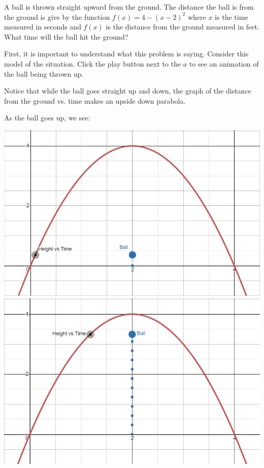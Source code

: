 \documentclass[nooutcomes]{ximera}
\begin{document}
\begin{example}
A ball is thrown straight upward from the ground.  The distance the ball is from the ground is give by the function $f(x)=4-(x-2)^2$ where $x$ is the time measured in seconds and $f(x)$ is the distance from the ground measured in feet.  What time will the ball hit the ground?

\begin{explanation}
First, it is important to understand what this problem is saying.  Consider this model of the situation.  Click the play button next to the $a$ to see an animation of the ball being thrown up.

\begin{center}  
\end{center}

Notice that while the ball goes straight up and down, the graph of the distance from the ground vs. time makes an upside down parabola.  

As the ball goes up, we see:
\begin{image}
\includegraphics{Zeros-BouncingBall1}
\includegraphics{Zeros-BouncingBall3}
\end{image}



\end{explanation}
\end{example}
\end{document}

